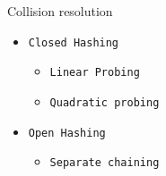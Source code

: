 \begin{frame}{Collision resolution}
    \begin{itemize}
        \item \texttt{Closed Hashing} \pause
        \begin{itemize}
           \item \texttt{Linear Probing} \pause
           \item \texttt{Quadratic probing} \pause
        \end{itemize}
        \item \texttt{Open Hashing} \pause
        \begin{itemize}
            \item \texttt{Separate chaining} \pause
        \end{itemize}
        
        
    \end{itemize}
\end{frame}
